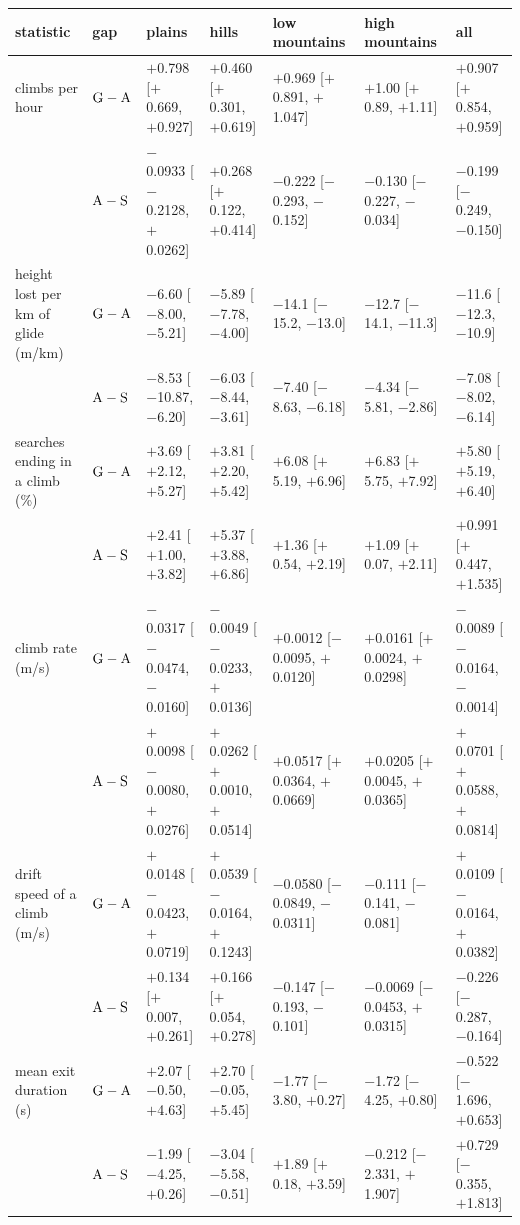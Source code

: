 \begin{tabular}{@{}l l l l l l l @{}}
\toprule
 statistic & gap & plains & hills & low mountains & high mountains & all \\
\midrule
climbs per hour & $\mathrm{G}-\mathrm{A}$ & $+$0.798 [$+$0.669, $+$0.927] & $+$0.460 [$+$0.301, $+$0.619] & $+$0.969 [$+$0.891, $+$1.047] & $+$1.00 [$+$0.89, $+$1.11] & $+$0.907 [$+$0.854, $+$0.959] \\
 & $\mathrm{A}-\mathrm{S}$ & $-$0.0933 [$-$0.2128, $+$0.0262] & $+$0.268 [$+$0.122, $+$0.414] & $-$0.222 [$-$0.293, $-$0.152] & $-$0.130 [$-$0.227, $-$0.034] & $-$0.199 [$-$0.249, $-$0.150] \\
\addlinespace
height lost per km of glide (m/km) & $\mathrm{G}-\mathrm{A}$ & $-$6.60 [$-$8.00, $-$5.21] & $-$5.89 [$-$7.78, $-$4.00] & $-$14.1 [$-$15.2, $-$13.0] & $-$12.7 [$-$14.1, $-$11.3] & $-$11.6 [$-$12.3, $-$10.9] \\
 & $\mathrm{A}-\mathrm{S}$ & $-$8.53 [$-$10.87, $-$6.20] & $-$6.03 [$-$8.44, $-$3.61] & $-$7.40 [$-$8.63, $-$6.18] & $-$4.34 [$-$5.81, $-$2.86] & $-$7.08 [$-$8.02, $-$6.14] \\
\addlinespace
searches ending in a climb (\%) & $\mathrm{G}-\mathrm{A}$ & $+$3.69 [$+$2.12, $+$5.27] & $+$3.81 [$+$2.20, $+$5.42] & $+$6.08 [$+$5.19, $+$6.96] & $+$6.83 [$+$5.75, $+$7.92] & $+$5.80 [$+$5.19, $+$6.40] \\
 & $\mathrm{A}-\mathrm{S}$ & $+$2.41 [$+$1.00, $+$3.82] & $+$5.37 [$+$3.88, $+$6.86] & $+$1.36 [$+$0.54, $+$2.19] & $+$1.09 [$+$0.07, $+$2.11] & $+$0.991 [$+$0.447, $+$1.535] \\
\addlinespace
climb rate (m/s) & $\mathrm{G}-\mathrm{A}$ & $-$0.0317 [$-$0.0474, $-$0.0160] & $-$0.0049 [$-$0.0233, $+$0.0136] & $+$0.0012 [$-$0.0095, $+$0.0120] & $+$0.0161 [$+$0.0024, $+$0.0298] & $-$0.0089 [$-$0.0164, $-$0.0014] \\
 & $\mathrm{A}-\mathrm{S}$ & $+$0.0098 [$-$0.0080, $+$0.0276] & $+$0.0262 [$+$0.0010, $+$0.0514] & $+$0.0517 [$+$0.0364, $+$0.0669] & $+$0.0205 [$+$0.0045, $+$0.0365] & $+$0.0701 [$+$0.0588, $+$0.0814] \\
\addlinespace
drift speed of a climb (m/s) & $\mathrm{G}-\mathrm{A}$ & $+$0.0148 [$-$0.0423, $+$0.0719] & $+$0.0539 [$-$0.0164, $+$0.1243] & $-$0.0580 [$-$0.0849, $-$0.0311] & $-$0.111 [$-$0.141, $-$0.081] & $+$0.0109 [$-$0.0164, $+$0.0382] \\
 & $\mathrm{A}-\mathrm{S}$ & $+$0.134 [$+$0.007, $+$0.261] & $+$0.166 [$+$0.054, $+$0.278] & $-$0.147 [$-$0.193, $-$0.101] & $-$0.0069 [$-$0.0453, $+$0.0315] & $-$0.226 [$-$0.287, $-$0.164] \\
\addlinespace
mean exit duration (s) & $\mathrm{G}-\mathrm{A}$ & $+$2.07 [$-$0.50, $+$4.63] & $+$2.70 [$-$0.05, $+$5.45] & $-$1.77 [$-$3.80, $+$0.27] & $-$1.72 [$-$4.25, $+$0.80] & $-$0.522 [$-$1.696, $+$0.653] \\
 & $\mathrm{A}-\mathrm{S}$ & $-$1.99 [$-$4.25, $+$0.26] & $-$3.04 [$-$5.58, $-$0.51] & $+$1.89 [$+$0.18, $+$3.59] & $-$0.212 [$-$2.331, $+$1.907] & $+$0.729 [$-$0.355, $+$1.813] \\
\bottomrule
\end{tabular}
